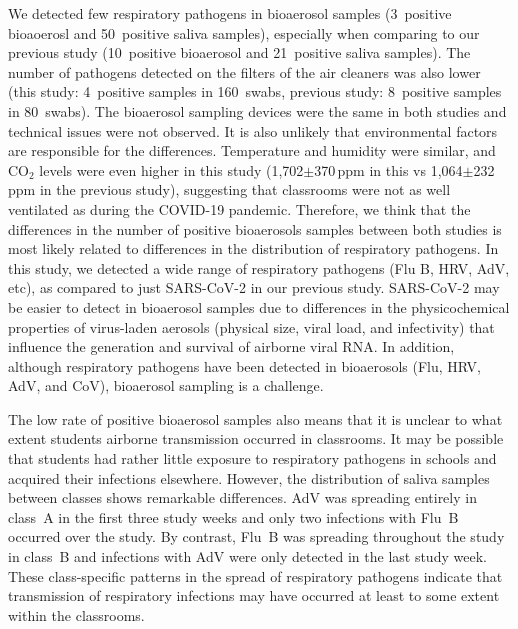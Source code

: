 \documentclass[fleqn,11pt]{wlscirep}
\begin{document}
We detected few respiratory pathogens in bioaerosol samples (3~positive bioaoerosl and 50~positive saliva samples), especially when comparing to our previous study\cite{Banholzer2023PLoSMed} (10~positive bioaerosol and 21~positive saliva samples). The number of pathogens detected on the filters of the air cleaners was also lower (this study: 4~positive samples in 160~swabs, previous study: 8~positive samples in 80~swabs). The bioaerosol sampling devices were the same in both studies and technical issues were not observed. It is also unlikely that environmental factors are responsible for the differences. Temperature and humidity were similar, and CO$_2$ levels were even higher in this study (1,702$\pm$370\,ppm in this vs 1,064$\pm$232\,ppm in the previous study), suggesting that classrooms were not as well ventilated as during the COVID-19 pandemic. Therefore, we think that the differences in the number of positive bioaerosols samples between both studies is most likely related to differences in the distribution of respiratory pathogens. In this study, we detected a wide range of respiratory pathogens (Flu B, HRV, AdV, etc), as compared to just SARS-CoV-2 in our previous study. SARS-CoV-2 may be easier to detect in bioaerosol samples due to differences in the physicochemical properties of virus-laden aerosols (\eg physical size, viral load, and infectivity) that influence the generation and survival of airborne viral RNA\cite{Wang2021,Sattar2016Book}. In addition, although respiratory pathogens have been detected in bioaerosols (\eg Flu\cite{Bischoff2013JID,Pan2017mSphere}, HRV\cite{Myatt2004AJRCCM,Fabian2011JAMPDD}, AdV\cite{Nguyen2017OFID,Pan2017mSphere}, and CoV\cite{Guo2020EID,Liu2020Nature}), bioaerosol sampling is a challenge\cite{Wang2021 ,Belser2023PLOSPath,Bekking2019IORV,Mainelis2020AST}. 


The low rate of positive bioaerosol samples also means that it is unclear to what extent students airborne transmission occurred in classrooms. It may be possible that students had rather little exposure to respiratory pathogens in schools and acquired their infections elsewhere. However, the distribution of saliva samples between classes shows remarkable differences. AdV was spreading entirely in class~A in the first three study weeks and only two infections with Flu~B occurred over the study. By contrast, Flu~B was spreading throughout the study in class~B and infections with AdV were only detected in the last study week. These class-specific patterns in the spread of respiratory pathogens indicate that transmission of respiratory infections may have occurred at least to some extent within the classrooms. 
\end{document}
